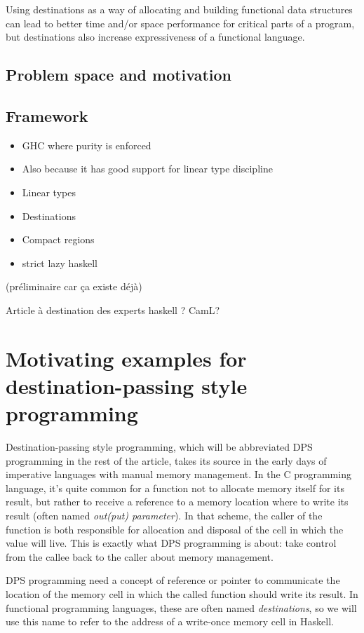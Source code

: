 \documentclass[english]{jflart}
\begin{document}
Using destinations as a way of allocating and building functional data structures can lead to better time and/or space performance for critical parts of a program, but destinations also increase expressiveness of a functional language.

\subsection{Problem space and motivation}

\subsection{Framework}

\begin{itemize}

\item GHC where purity is enforced
\item Also because it has good support for linear type discipline
\item Linear types
\item Destinations
\item Compact regions
\item strict lazy haskell

\end{itemize}

(préliminaire car ça existe déjà)

Article à destination des experts haskell ? CamL?

\section{Motivating examples for destination-passing style programming}

Destination-passing style programming, which will be abbreviated DPS programming in the rest of the article, takes its source in the early days of imperative languages with manual memory management. In the C programming language, it's quite common for a function not to allocate memory itself for its result, but rather to receive a reference to a memory location where to write its result (often named \emph{out(put) parameter}). In that scheme, the caller of the function is both responsible for allocation and disposal of the cell in which the value will live. This is exactly what DPS programming is about: take control from the callee back to the caller about memory management.

DPS programming need a concept of reference or pointer to communicate the location of the memory cell in which the called function should write its result. In functional programming languages, these are often named \emph{destinations}, so we will use this name to refer to the address of a write-once memory cell in Haskell.
\end{document}
